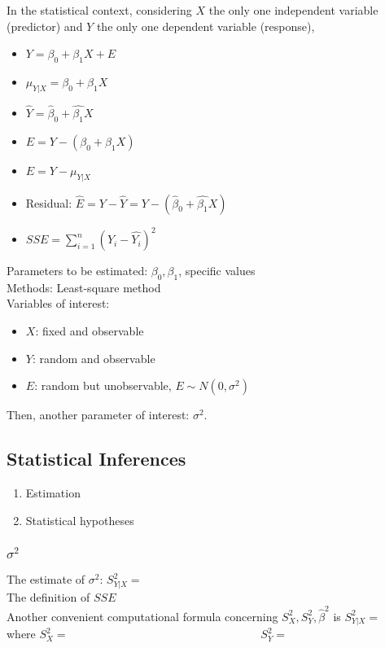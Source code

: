\documentclass[paper=a4, fontsize=11pt]{scrartcl} %
\numberwithin{equation}{section} %
\numberwithin{figure}{section} %
\numberwithin{table}{section} %
\begin{document}
In the statistical context, considering $X$ the only one independent variable (predictor) and $Y$ the only one dependent variable (response), 
\begin{itemize}
	\item $Y = \beta_0 + \beta_1X + E$
	\item $\mu_{Y|X} = \beta_0 + \beta_1X$
	\item $\hat{Y} = \hat{\beta}_0 + \hat{\beta_1}X$
	\item $E = Y - (\beta_0 + \beta_1X)$
	\item $E = Y - \mu_{Y|X}$
	\item Residual: $\hat{E} = Y - \hat{Y} = Y - (\hat{\beta}_0 + \hat{\beta_1}X)$
	\item $SSE = \sum_{i=1}^{n}(Y_i-\hat{Y_i})^2$
\end{itemize}

Parameters to be estimated: $\beta_0, \beta_1$, specific values
\\Methods: Least-square method
\\Variables of interest: 
\begin{itemize}
	\item $X$: fixed and observable
	\item $Y$: random and observable 
	\item $E$: random but unobservable, $E \sim N(0, \sigma^2)$  
\end{itemize}
Then, another parameter of interest: $\sigma^2$.


\subsection{Statistical Inferences}
\begin{enumerate}
\item Estimation
\item Statistical hypotheses
\end{enumerate}

\subsubsection{$\sigma^2$}
The estimate of $\sigma^2$: $S^2_{Y|X} =$
\\The definition of $SSE$
\\Another convenient computational formula concerning $S^2_X, S^2_Y, \hat{\beta}^2$ is $S^2_{Y|X} = $
\\where $S^2_X = $~~~~~~~~~~~~~~~~~~~~~~~~~~~~~~~~~ $S^2_Y = $
\end{document}
